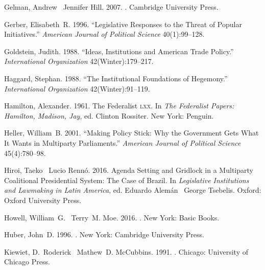 \documentclass[letter,12pt]{article}
\begin{document}
\begin{thebibliography}{xx}
Gelman, Andrew \harvardand\ Jennifer Hill. 2007.
.
\newblock Cambridge University Press.

Gerber, Elisabeth~R. 1996.
\newblock ``Legislative Responses to the Threat of Popular Initiatives.'' {\em
  American Journal of Political Science} 40(1):99--128.

Goldstein, Judith. 1988.
\newblock ``Ideas, Institutions and American Trade Policy.'' {\em International
  Organization} 42(Winter):179--217.

Haggard, Stephan. 1988.
\newblock ``The Institutional Foundations of Hegemony.'' {\em International
  Organization} 42(Winter):91--119.

Hamilton, Alexander. 1961.
\newblock The Federalist \textsc{lxx}.  In {\em The Federalist Papers:
  Hamilton, Madison, Jay}, ed. Clinton Rossiter.
\newblock New York:  Penguin.

Heller, William~B. 2001.
\newblock ``Making Policy Stick: Why the Government Gets What It Wants in
  Multiparty Parliaments.'' {\em American Journal of Political Science}
  45(4):780--98.

Hiroi, Taeko \harvardand\ Lucio Renn\'o. 2016.
\newblock Agenda Setting and Gridlock in a Multiparty Coalitional Presidential
  System: The Case of Brazil.  In {\em Legislative Institutions and Lawmaking
  in Latin America}, ed. Eduardo Alem\'an \harvardand\ George Tsebelis.
\newblock Oxford:  Oxford University Press.

Howell, William~G. \harvardand\ Terry~M. Moe. 2016.
.
\newblock New York:  Basic Books.

Huber, John~D. 1996.
.
\newblock New York:  Cambridge University Press.

Kiewiet, D.~Roderick \harvardand\ Mathew~D. McCubbins. 1991.
.
\newblock Chicago:  University of Chicago Press.


\end{thebibliography}
\end{document}
